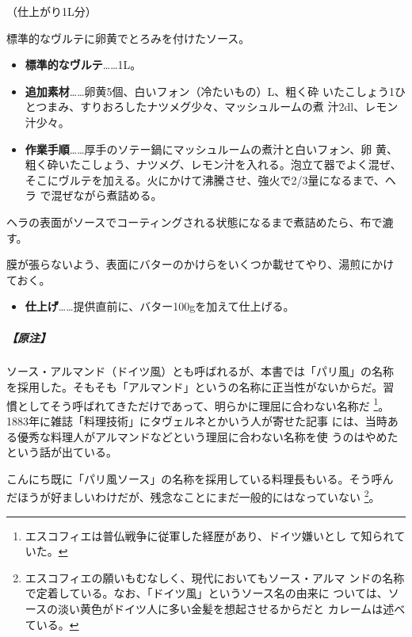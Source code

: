 \begin{recette}
（仕上がり1L分）

標準的なヴルテに卵黄でとろみを付けたソース。

\begin{itemize}
\item
  \textbf{標準的なヴルテ}\ldots{}\ldots{}1L。
\item
  \textbf{追加素材}\ldots{}\ldots{}卵黄5個、白いフォン（冷たいもの）\undemi{}L、粗く砕
  いたこしょう1ひとつまみ、すりおろしたナツメグ少々、マッシュルームの煮
  汁2dl、レモン汁少々。
\item
  \textbf{作業手順}\ldots{}\ldots{}厚手のソテー鍋にマッシュルームの煮汁と白いフォン、卵
  黄、粗く砕いたこしょう、ナツメグ、レモン汁を入れる。泡立て器でよく混ぜ、
  そこにヴルテを加える。火にかけて沸騰させ、強火で2/3量になるまで、ヘラ
  で混ぜながら煮詰める。
\end{itemize}

ヘラの表面がソースでコーティングされる状態になるまで煮詰めたら、布で漉
す。

膜が張らないよう、表面にバターのかけらをいくつか載せてやり、湯煎にかけ
ておく。

\begin{itemize}
\tightlist
\item
  \textbf{仕上げ}\ldots{}\ldots{}提供直前に、バター100gを加えて仕上げる。
\end{itemize}

\hypertarget{ux539fux6ce8-3}{%
\subparagraph{【原注】}\label{ux539fux6ce8-3}}

ソース・アルマンド（ドイツ風）とも呼ばれるが、本書では「パリ風」の名称
を採用した。そもそも「アルマンド」というの名称に正当性がないからだ。習
慣としてそう呼ばれてきただけであって、明らかに理屈に合わない名称だ
\footnote{エスコフィエは普仏戦争に従軍した経歴があり、ドイツ嫌いとし
  て知られていた。}。1883年に雑誌「料理技術」にタヴェルネとかいう人が寄せた記事
には、当時ある優秀な料理人がアルマンドなどという理屈に合わない名称を使
うのはやめたという話が出ている。

こんにち既に「パリ風ソース」の名称を採用している料理長もいる。そう呼ん
だほうが好ましいわけだが、残念なことにまだ一般的にはなっていない
\footnote{エスコフィエの願いもむなしく、現代においてもソース・アルマ
  ンドの名称で定着している。なお、「ドイツ風」というソース名の由来に
  ついては、ソースの淡い黄色がドイツ人に多い金髪を想起させるからだと
  カレームは述べている。}。

\maeaki

\hypertarget{ux30bdux30fcux30b9ux30b7ux30e5ux30d7ux30ecux30fcux30e0102023}{%
}
\end{recette}
